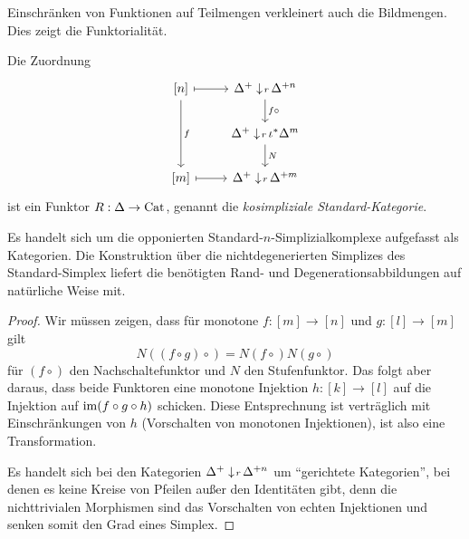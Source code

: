 Einschränken von Funktionen auf Teilmengen verkleinert auch die
Bildmengen. Dies zeigt die Funktorialität.
\begin{prop}
  Die Zuordnung
  \[ \begin{tikzcd}
    {[n]} \arrow{dd}{f} \rar[mapsto]
    & \slicecat{\Delta^+}{r}{\Delta^{+n}} \dar{f \circ} \\
    & \slicecat{\Delta^+}{r}{\iota^* \Delta^m} \dar{N} \\
    {[m]} \rar[mapsto]
    & \slicecat{\Delta^+}{r}{\Delta^{+m}}
  \end{tikzcd} \]
  ist ein Funktor $R: \Delta \to \operatorname{Cat}$, genannt die
  \emph{kosimpliziale Standard-Kategorie}.
\end{prop}
\begin{bem}
  Es handelt sich um die opponierten Standard-$n$-Simplizialkomplexe
  aufgefasst als Kategorien. Die Konstruktion über die
  nichtdegenerierten Simplizes des Standard-Simplex liefert die
  benötigten Rand- und Degenerationsabbildungen auf natürliche Weise
  mit.
\end{bem}
\begin{proof}
  Wir müssen zeigen, dass für monotone $f: [m] \to [n]$ und $g: [l]
  \to [m]$ gilt
  \[ N ((f \circ g)\circ) = N (f \circ) N (g \circ) \]
  für $(f \circ)$ den Nachschaltefunktor und $N$ den
  Stufenfunktor. Das folgt aber daraus, dass beide Funktoren eine
  monotone Injektion $h: [k] \to [l]$ auf die Injektion auf $\operatorname{im} (f
  \circ g \circ h)$ schicken. Diese Entsprechnung ist verträglich mit
  Einschränkungen von $h$ (Vorschalten von monotonen Injektionen), ist
  also eine Transformation.

  Es handelt sich bei den Kategorien
  $\Delta^+ \downarrow \! {\scriptstyle r} \, \Delta^{+n}$ um ``gerichtete Kategorien'',
  bei denen es keine Kreise von Pfeilen außer den Identitäten gibt,
  denn die nichttrivialen Morphismen sind das Vorschalten von echten
  Injektionen und senken somit den Grad eines Simplex.
\end{proof}

